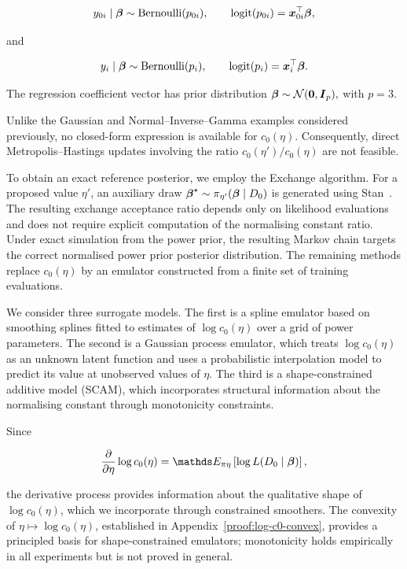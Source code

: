 \begin{equation}
    y_{0i}\mid\boldsymbol{\beta}
    \sim
    \mathrm{Bernoulli}(p_{0i}),
    \qquad
    \operatorname*{logit}(p_{0i})
    =
    \boldsymbol{x}_{0i}^{\top}\boldsymbol{\beta},
\end{equation}

and

\begin{equation}
    y_i\mid\boldsymbol{\beta}
    \sim
    \mathrm{Bernoulli}(p_i),
    \qquad
    \operatorname*{logit}(p_i)
    =
    \boldsymbol{x}_i^{\top}\boldsymbol{\beta}.
\end{equation}

The regression coefficient vector has prior distribution $\boldsymbol{\beta}\sim\mathcal{N}(\boldsymbol{0},\boldsymbol{I}_p),$ with $p=3$.

Unlike the Gaussian and Normal--Inverse--Gamma examples considered previously, no closed-form expression is available for $c_0(\eta)$.
Consequently, direct Metropolis--Hastings updates involving the ratio $c_0(\eta')/c_0(\eta)$ are not feasible.

To obtain an exact reference posterior, we employ the Exchange algorithm.
For a proposed value $\eta'$, an auxiliary draw $\boldsymbol{\beta}^\star \sim \pi_{\eta'}(\boldsymbol{\beta}\mid D_0)$ is generated using Stan~\cite{carpenter2017}.
The resulting exchange acceptance ratio depends only on likelihood evaluations and does not require explicit computation of the normalising constant ratio.
Under exact simulation from the power prior, the resulting Markov chain targets the correct normalised power prior posterior distribution.
The remaining methods replace $c_0(\eta)$ by an emulator constructed from a finite set of training evaluations.

We consider three surrogate models. The first is a spline emulator based on smoothing splines fitted to estimates of $\log c_0(\eta)$ over a grid of power parameters.
The second is a Gaussian process emulator, which treats $\log c_0(\eta)$ as an unknown latent function and uses a probabilistic interpolation model to predict its value at unobserved values of $\eta$.
The third is a shape-constrained additive model (SCAM), which incorporates structural information about the normalising constant through monotonicity constraints.

Since

\begin{equation}
\frac{\partial}{\partial\eta}
\log c_0(\eta)
=
\bE_{\pi\eta}
\left[
\log L(D_0\mid\bfbt)
\right],
\end{equation}

the derivative process provides information about the qualitative shape of $\log c_0(\eta)$, which we incorporate through constrained smoothers.
The convexity of $\eta \mapsto \log c_0(\eta)$, established in Appendix~\ref{proof:log-c0-convex}, provides a principled basis for shape-constrained emulators; monotonicity holds empirically in all experiments but is not proved in general.

